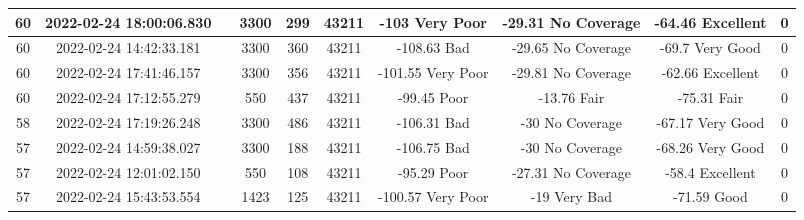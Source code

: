 \begin{longtable*}{|c|c|c|c|c|c|c|c|c|c|}
60&2022-02-24 18:00:06.830&&3300&299&43211& -103      Very Poor   & -29.31    No Coverage & -64.46    Excellent   & 0\\\hline
{}60&2022-02-24 14:42:33.181&&3300&360&43211& -108.63   Bad         & -29.65    No Coverage & -69.7     Very Good   & 0\\\hline
{}60&2022-02-24 17:41:46.157&&3300&356&43211& -101.55   Very Poor   & -29.81    No Coverage & -62.66    Excellent   & 0\\\hline
{}60&2022-02-24 17:12:55.279&&550&437&43211& -99.45    Poor        & -13.76    Fair        & -75.31    Fair        & 0\\\hline
{}58&2022-02-24 17:19:26.248&&3300&486&43211& -106.31   Bad         & -30       No Coverage & -67.17    Very Good   & 0\\\hline
{}57&2022-02-24 14:59:38.027&&3300&188&43211& -106.75   Bad         & -30       No Coverage & -68.26    Very Good   & 0\\\hline
{}57&2022-02-24 12:01:02.150&&550&108&43211& -95.29    Poor        & -27.31    No Coverage & -58.4     Excellent   & 0\\\hline
{}57&2022-02-24 15:43:53.554&&1423&125&43211& -100.57   Very Poor   & -19       Very Bad    & -71.59    Good        & 0\\\hline

\end{longtable*}
